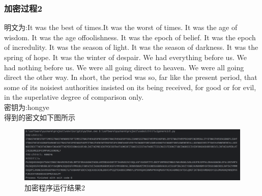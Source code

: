     \subsubsection{加密过程2}
        明文为:It was the best of times.It was the worst of times. It was the age of wisdom. It was the 
        age offoolishness. It was the epoch of belief. It was the epoch of incredulity. It was the season
        of light. It was the season of darkness. It was the spring of hope. It was the winter of despair.
        We had everything before us. We had nothing before us. We were all going direct to heaven. We were 
        all going direct the other way. In short, the period was so, far like the present period, that some 
        of its noisiest authorities insisted on its being received, for good or for evil, in the superlative 
        degree of comparison only.\\
        密钥为:hongye\\
        得到的密文如下图所示
        \begin{figure}[htbp] %
            \centering    %
            \includegraphics[width=18cm]{images/vigenere_result_2.png}  %
            \caption{加密程序运行结果2}    %
            \label{pic1}        %
        \end{figure}
    